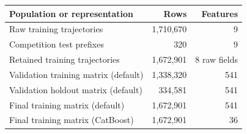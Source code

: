 \begin{tabularx}{\linewidth}{@{}Xrr@{}}
\toprule
Population or representation & Rows & Features \\
\midrule
Raw training trajectories & 1,710,670 & 9 \\
Competition test prefixes & 320 & 9 \\
Retained training trajectories & 1,672,901 & 8 raw fields \\
Validation training matrix (default) & 1,338,320 & 541 \\
Validation holdout matrix (default) & 334,581 & 541 \\
Final training matrix (default) & 1,672,901 & 541 \\
Final training matrix (CatBoost) & 1,672,901 & 36 \\
\bottomrule
\end{tabularx}

